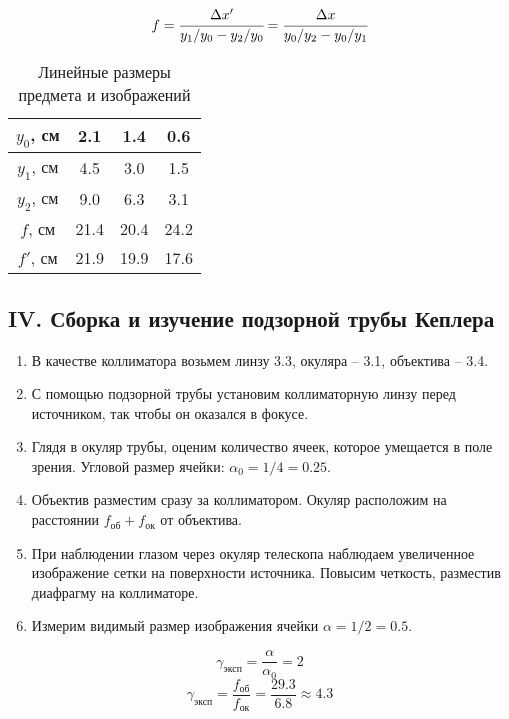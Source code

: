 \documentclass[a4paper,12pt]{article}
\begin{document}
\begin{equation*}
    f = \cfrac{\Delta x'}{y_1/y_0 - y_2/y_0} = \cfrac{\Delta x}{y_0/y_2 - y_0/y_1}
\end{equation*}


\begin{table}[!h]
	\caption{Линейные размеры предмета и изображений}
	\label{table:3}	
	\begin{center}
		\begin{tabular}{|c|c|c|c|}
			\hline
			$y_0$, см & 2.1 & 1.4 & 0.6 \\ \hline
			$y_1$, см & 4.5 & 3.0 & 1.5 \\ \hline
            $y_2$, см & 9.0 & 6.3 & 3.1 \\ \hline
            $f$, см & 21.4 & 20.4 & 24.2 \\ \hline
            $f'$, см & 21.9 & 19.9 & 17.6 \\ \hline
		\end{tabular}
	\end{center}
\end{table}

\clearpage

\subsection*{IV. Сборка и изучение подзорной трубы Кеплера}

\begin{enumerate}
    \item В качестве коллиматора возьмем линзу 3.3, окуляра -- 3.1, объектива -- 3.4.
    \item С помощью подзорной трубы установим коллиматорную линзу перед источником, так чтобы он оказался в фокусе.
    \item Глядя в окуляр трубы, оценим количество ячеек, которое умещается в поле зрения. Угловой размер ячейки: $\alpha_0 = 1 / 4 = 0.25$.
    \item Объектив разместим сразу за коллиматором. Окуляр расположим на расстоянии $f_\text{об} + f_\text{ок}$ от объектива.
    \item При наблюдении глазом через окуляр телескопа наблюдаем увеличенное изображение сетки на поверхности источника. Повысим четкость, разместив диафрагму на коллиматоре.
    \item Измерим видимый размер изображения ячейки $\alpha = 1 / 2 = 0.5$.
\end{enumerate}

\begin{equation*}
    \gamma_\text{эксп} = \frac{\alpha}{\alpha_0} = 2
\end{equation*}
\begin{equation*}
    \gamma_\text{эксп} = \frac{f_\text{об}}{f_\text{ок}} = \frac{29.3}{6.8} \approx 4.3
\end{equation*}
\end{document}
